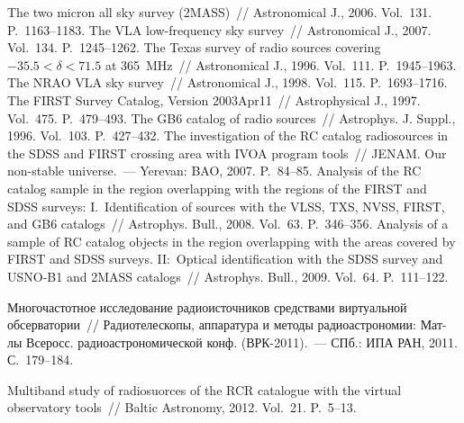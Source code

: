 \begin{multicols}{2}
{{\begin{thebibliography}{99}
 The two micron all sky survey (2MASS)~// 
Astronomical J., 2006. Vol.~131. P.~1163--1183. 
The VLA low-frequency sky survey~// Astronomical J., 2007. Vol.~134. P.~1245--1262.
The Texas survey of 
radio sources covering $-35.5 < \delta < 71.5$ at 365~MHz~// Astronomical J., 1996. Vol.~111. 
P.~1945--1963. 
 The NRAO VLA sky survey~// Astronomical J., 1998. Vol.~115. P.~1693--1716. 
 The FIRST 
Survey Catalog, Version 2003Apr11~// Astrophysical J., 1997. Vol.~475. P.~479--493. 
The GB6 catalog of radio sources~// 
Astrophys. J. Suppl., 1996. Vol.~103. P.~427--432. 
 The investigation of the RC catalog 
radiosources in the SDSS and FIRST crossing area with IVOA program tools~// \mbox{JENAM}. Our 
non-stable universe.~--- Yerevan: BAO, 2007. P.~84--85.
Analysis of the RC catalog sample in the region overlapping 
with the regions of the FIRST and SDSS surveys: I.~Identification of sources with the VLSS, TXS, 
NVSS, FIRST, and GB6 catalogs~// Astrophys. Bull., 2008. Vol.~63. P.~346--356.
 Analysis of a sample of RC catalog objects in the region 
overlapping with the areas covered by FIRST and SDSS surveys. II:~Optical identification with the 
SDSS survey and USNO-B1 and 2MASS catalogs~// Astrophys. Bull., 2009. Vol.~64. P.~111--122. 

 Многочастотное 
исследование радиоисточников средствами виртуальной обсерватории~// Радиотелескопы, 
аппаратура и методы радиоастрономии: Мат-лы Всеросс. радиоастрономической 
конф. (ВРК-2011).~---  СПб.: ИПА РАН, 2011. С.~179--184. 

 Multiband study of 
radiosuorces of the RCR catalogue with the virtual observatory tools~// Baltic Astronomy, 2012. 
Vol.~21. P.~5--13. 


\end{thebibliography}}}
\end{multicols}
